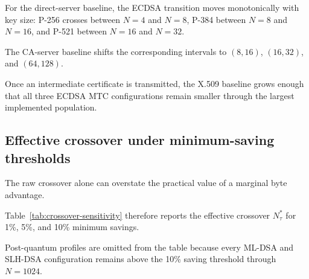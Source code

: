 \documentclass[journal]{IEEEtran}
\begin{document}
For the direct-server baseline, the ECDSA transition moves monotonically with key size: P-256 crosses between $N=4$ and $N=8$, P-384 between $N=8$ and $N=16$, and P-521 between $N=16$ and $N=32$.

The CA-server baseline shifts the corresponding intervals to $(8,16)$, $(16,32)$, and $(64,128)$.

Once an intermediate certificate is transmitted, the X.509 baseline grows enough that all three ECDSA MTC configurations remain smaller through the largest implemented population.



\subsection{Effective crossover under minimum-saving thresholds}

\label{sec:crossover-sensitivity}



The raw crossover alone can overstate the practical value of a marginal byte advantage.

Table~\ref{tab:crossover-sensitivity} therefore reports the effective crossover $N^*_{\tau}$ for 1\%, 5\%, and 10\% minimum savings.

Post-quantum profiles are omitted from the table because every ML-DSA and SLH-DSA configuration remains above the 10\% saving threshold through $N=1024$.
\end{document}

